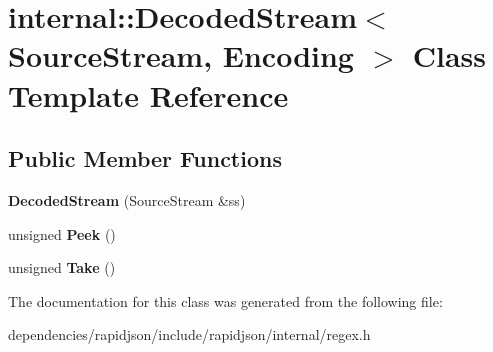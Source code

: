 \hypertarget{classinternal_1_1_decoded_stream}{}\section{internal\+:\+:Decoded\+Stream$<$ Source\+Stream, Encoding $>$ Class Template Reference}
\label{classinternal_1_1_decoded_stream}
\subsection*{Public Member Functions}
\begin{DoxyCompactItemize}
\item 
\mbox{\label{classinternal_1_1_decoded_stream_a45cf40c4e515be8aaa8cd020eaa67595}} 
{\bfseries Decoded\+Stream} (Source\+Stream \&ss)
\item 
\mbox{\label{classinternal_1_1_decoded_stream_ac78f2cbc03ae0d79a0fcfe6d56589d70}} 
unsigned {\bfseries Peek} ()
\item 
\mbox{\label{classinternal_1_1_decoded_stream_a62b45969ce169bef1da0600490329857}} 
unsigned {\bfseries Take} ()
\end{DoxyCompactItemize}


The documentation for this class was generated from the following file\+:\begin{DoxyCompactItemize}
\item 
dependencies/rapidjson/include/rapidjson/internal/regex.\+h\end{DoxyCompactItemize}
